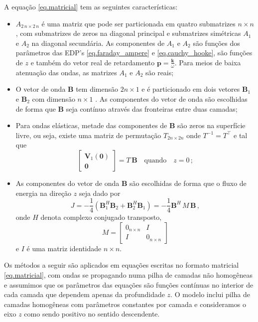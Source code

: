 A equação \ref{eq.matricial} tem as seguintes caracter\'isticas:
\begin{itemize}
\item $A_{2\,n\times2\,n}$ \'e uma matriz que pode ser particionada em quatro submatrizes $n\times n$, com submatrizes de zeros na diagonal principal e submatrizes sim\'etricas $A_1$ e $A_2$ na diagonal secund\'aria. As componentes de $A_1$ e $A_2$ s\~ao fun\c{c}\~oes dos par\^ametros das EDP's \ref{eq.faraday_ampere} e \ref{eq.cauchy_hooke}, s\~ao fun\c{c}\~oes de $z$ e tamb\'em do vetor real de retardamento $\mathbf{p}=\frac{\mathbf{k}}{\omega}$. Para meios de baixa atenua\c{c}\~ao das ondas, as matrizes $A_1$ e $A_2$ s\~ao reais; 
\item O vetor de onda $\mathbf{B}$ tem dimens\~ao $2n\times1$ e \'e particionado em dois vetores $\mathbf{B}_1$ e $\mathbf{B}_2$ com dimens\~ao $n\times1$ . As componentes do vetor de onda s\~ao escolhidas de forma que $\mathbf{B}$ seja cont\'inuo atrav\'es das fronteiras entre duas camadas;
\item  Para ondas el\'asticas, metade das componentes de $\mathbf{B}$ s\~ao zeros na superf\'icie livre, ou seja, existe uma matriz de permuta\c{c}\~ao $T_{2n\times2n}$ onde $T^{-1}=T^\top$ e tal que
\begin{equation*}
\begin{bmatrix}
\mathbf{V}_1(\mathbf{0})\\
\mathbf{0}
\end{bmatrix}
=T\,\mathbf{B}\quad\text{quando}\quad z = 0\,;
\end{equation*}
\item As componentes do vetor de onda $\mathbf{B}$ s\~ao escolhidas de forma que o fluxo de energia na dire\c{c}\~ao $z$ seja dado por
\begin{equation*}
J=-\frac{1}{4}(\mathbf{B}_1^H\mathbf{B}_2+\mathbf{B}_2^H\mathbf{B}_1)=-\frac{1}{4}\mathbf{B}^H\,M\, \mathbf{B}\,,
\end{equation*}
onde $H$ denota complexo conjugado transposto,
\begin{equation*}
M=
\begin{bmatrix}
0_{n\times n}&I\\
I&0_{n\times n}
\end{bmatrix}
\end{equation*}
e $I$ \'e uma matriz identidade $n\times n$.
\end{itemize}

Os m\'etodos a seguir s\~ao aplicados em equa\c{c}\~oes escritas no formato matricial \ref{eq.matricial}, com ondas se propagando numa pilha de camadas n\~ao homog\^eneas e assumimos que os par\^ametros das equa\c{c}\~oes s\~ao fun\c{c}\~oes cont\'inuas no interior de cada camada que dependem apenas da profundidade $z$. O modelo inclui pilha de camadas homog\^eneas com par\^ametros constantes por camada e consideramos o eixo $z$ como sendo positivo no sentido descendente.   

